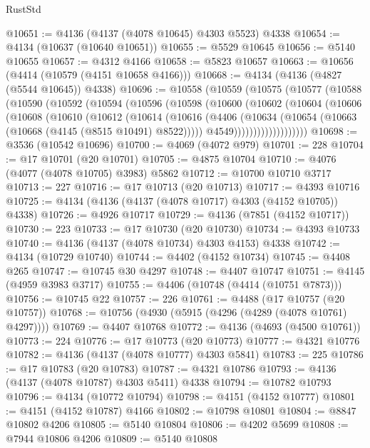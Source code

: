 \begin{lexlean}{RustStd}
\begin{coremodule}
@10651 := @4136 (@4137 (@4078 @10645) @4303 @5523) @4338
@10654 := @4134 (@10637 (@10640 @10651))
@10655 := @5529 @10645
@10656 := @5140 @10655
@10657 := @4312 @4166
@10658 := @5823 @10657
@10663 := @10656 (@4414 (@10579 (@4151 @10658 @4166)))
@10668 := @4134 (@4136 (@4827 (@5544 @10645)) @4338)
@10696 := @10558
    (@10559
      (@10575
        (@10577
          (@10588
            (@10590
              (@10592
                (@10594
                  (@10596
                    (@10598
                      (@10600
                        (@10602
                          (@10604
                            (@10606
                              (@10608
                                (@10610
                                  (@10612
                                    (@10614
                                      (@10616
                                        (@4406
                                          (@10634
                                            (@10654 (@10663 (@10668 (@4145 (@8515 @10491) @8522)))))
                                          @4549)))))))))))))))))))
@10698 := @3536 (@10542 @10696)
@10700 := @4069 (@4072 @979)
@10701 := 228
@10704 := @17 @10701 (@20 @10701)
@10705 := @4875 @10704
@10710 := @4076 (@4077 (@4078 @10705) @3983) @5862
@10712 := @10700 @10710 @3717
@10713 := 227
@10716 := @17 @10713 (@20 @10713)
@10717 := @4393 @10716
@10725 := @4134 (@4136 (@4137 (@4078 @10717) @4303 (@4152 @10705)) @4338)
@10726 := @4926 @10717
@10729 := @4136 (@7851 (@4152 @10717))
@10730 := 223
@10733 := @17 @10730 (@20 @10730)
@10734 := @4393 @10733
@10740 := @4136 (@4137 (@4078 @10734) @4303 @4153) @4338
@10742 := @4134 (@10729 @10740)
@10744 := @4402 (@4152 @10734)
@10745 := @4408 @265
@10747 := @10745 @30 @4297
@10748 := @4407 @10747
@10751 := @4145 (@4959 @3983 @3717)
@10755 := @4406 (@10748 (@4414 (@10751 @7873)))
@10756 := @10745 @22
@10757 := 226
@10761 := @4488 (@17 @10757 (@20 @10757))
@10768 := @10756 (@4930 (@5915 (@4296 (@4289 (@4078 @10761) @4297))))
@10769 := @4407 @10768
@10772 := @4136 (@4693 (@4500 @10761))
@10773 := 224
@10776 := @17 @10773 (@20 @10773)
@10777 := @4321 @10776
@10782 := @4136 (@4137 (@4078 @10777) @4303 @5841)
@10783 := 225
@10786 := @17 @10783 (@20 @10783)
@10787 := @4321 @10786
@10793 := @4136 (@4137 (@4078 @10787) @4303 @5411) @4338
@10794 := @10782 @10793
@10796 := @4134 (@10772 @10794)
@10798 := @4151 (@4152 @10777)
@10801 := @4151 (@4152 @10787) @4166
@10802 := @10798 @10801
@10804 := @8847 @10802 @4206
@10805 := @5140 @10804
@10806 := @4202 @5699
@10808 := @7944 @10806 @4206
@10809 := @5140 @10808

\end{coremodule}
\end{lexlean}
